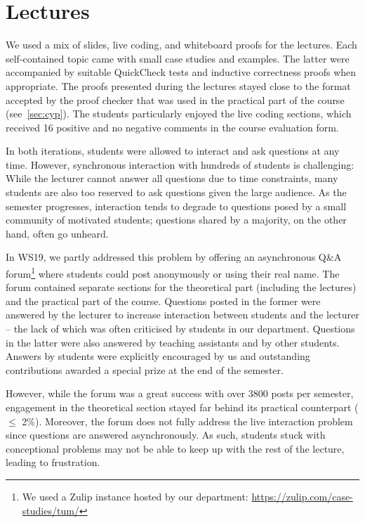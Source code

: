 \section{Lectures}\label{sec:lectures}

We used a mix of
slides,
live coding, and whiteboard proofs for the lectures.
Each self-contained topic came with small case studies and examples.
The latter were accompanied by suitable QuickCheck tests
and inductive correctness proofs when appropriate.
The proofs presented during the lectures stayed close to the format accepted by the proof checker that was used in the practical part of the course (see~\cref{sec:cyp}).
The students particularly enjoyed the live coding sections,
which received 16 positive and no negative comments in the course evaluation form.

In both iterations, students were allowed to interact and ask questions at any time.
However, synchronous interaction with hundreds of students is challenging:
While the lecturer cannot answer all questions due to time constraints,
many students are also too reserved to ask questions given the large audience.
As the semester progresses, interaction tends to degrade to
questions posed by a small community of motivated students;
questions shared by a majority, on the other hand, often go unheard.

In WS19, we partly addressed this problem by offering an asynchronous Q\&A forum\footnote{We used a Zulip instance hosted by our department: \url{https://zulip.com/case-studies/tum/}}
where students could post anonymously or using their real name.
The forum contained separate sections for the theoretical part (including the lectures)
and the practical part of the course.
Questions posted in the former were answered by the lecturer
to increase interaction between students and the lecturer -- the lack of which was often criticised by students in our department.
Questions in the latter were also answered by teaching assistants and by other students.
Answers by students were explicitly encouraged by us and
outstanding contributions awarded a special prize at the end of the semester.

However, while the forum was a great success with over 3800 posts per semester,
engagement in the theoretical section stayed far behind its practical counterpart ($\leq$ 2\%).
Moreover, the forum does not fully address the live interaction problem since
questions are answered asynchronously.
As such, students stuck with conceptional problems may not be able
to keep up with the rest of the lecture,
leading to frustration.


